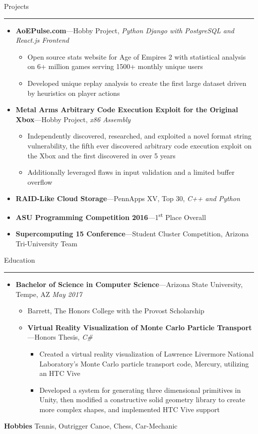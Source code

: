 \documentclass[10pt,oneside]{article}
\newcommand{\hobbies}{Tennis, Outrigger Canoe, Chess, Car-Mechanic}
\newcommand{\sectitle}[1]{
  \begin{flushleft}{\selectfont\Large#1}\end{flushleft}
}
\newenvironment{ressection}[1]{
  \vspace{0pt}
  \sectitle{#1}
  \vspace{-10pt}\rule{\textwidth}{0.5pt}
  \vspace{-10pt}
  \begin{itemize}[leftmargin=13pt]
  \vspace{-2pt}
}{
  \end{itemize}
}
\newcommand{\ressubitem}[1]{
  \vspace{-1pt}
  \item[--] \begin{flushleft} #1 \end{flushleft}
}
\newcommand{\resmeditem}[2]{
  \vspace{-5pt}
  \item
  \textbf{#1}---#2
}
\newcommand{\resbigitemline}[3]{
  \vspace{-1pt}
  \item
  \textbf{#1}---#2
  \hfill
  \textit{#3}
}
\newcommand{\resbigitemlinenodate}[3]{
  \vspace{-1pt}
  \item
  \textbf{#1}---#2,
  \textit{#3}
}
\newenvironment{ressubsecline}[3]{
  \resbigitemline{#1}{#2}{#3}
  \vspace{-2pt}
  \begin{itemize}
}{
  \end{itemize}
  \vspace{-2pt}
}
\newenvironment{ressubseclinenodate}[3]{
  \resbigitemlinenodate{#1}{#2}{#3}
  \vspace{-2pt}
  \begin{itemize}
}{
  \end{itemize}
}
\begin{document}
\begin{ressection}{Projects}
  \begin{ressubseclinenodate}{AoEPulse.com}{Hobby Project}{Python Django with PostgreSQL and React.js Frontend}
    \ressubitem{Open source stats website for Age of Empires 2 with statistical analysis on 6+ million games serving 1500+ monthly unique users}
    \ressubitem{Developed unique replay analysis to create the first large dataset driven by heuristics on player actions}
  \end{ressubseclinenodate}
  \begin{ressubseclinenodate}{Metal Arms Arbitrary Code Execution Exploit for the Original Xbox}{Hobby Project}{x86 Assembly}
    \ressubitem{Independently discovered, researched, and exploited a novel format string vulnerability, the fifth ever discovered arbitrary code execution exploit on the Xbox and the first discovered in over 5 years}
    \ressubitem{Additionally leveraged flaws in input validation and a limited buffer overflow}
  \end{ressubseclinenodate}
  \resbigitemlinenodate{RAID-Like Cloud Storage}{PennApps XV, Top 30}{C++ and Python}
  \resmeditem{ASU Programming Competition 2016}{1\textsuperscript{st} Place Overall}
  \resmeditem{Supercomputing 15 Conference}{Student Cluster Competition,}{Arizona Tri-University Team}
\end{ressection}

\begin{ressection}{Education}
  \begin{ressubsecline}{Bachelor of Science in Computer Science}{Arizona State University, Tempe, AZ}{May 2017}
    \ressubitem{Barrett, The Honors College with the Provost Scholarship}
    \begin{ressubseclinenodate}{Virtual Reality Visualization of Monte Carlo Particle Transport}{Honors Thesis}{C\#}
      \ressubitem{Created a virtual reality visualization of Lawrence Livermore National Laboratory's Monte Carlo particle transport code, Mercury, utilizing an HTC Vive}
      \ressubitem{Developed a system for generating three dimensional primitives in Unity, then modified a constructive solid geometry library to create more complex shapes, and implemented HTC Vive support}
    \end{ressubseclinenodate}
  \end{ressubsecline}
\end{ressection}

\textbf{Hobbies} \hobbies \\
\end{document}
